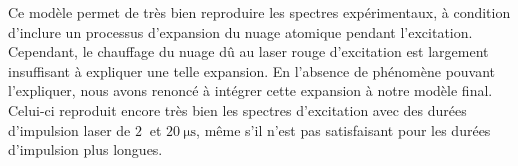 %

Ce modèle permet de très bien reproduire les spectres expérimentaux, à condition d'inclure un processus d'expansion du nuage atomique pendant l'excitation.
Cependant, le chauffage du nuage dû au laser rouge d'excitation est largement insuffisant à expliquer une telle expansion.
En l'absence de phénomène pouvant l'expliquer, nous avons renoncé à intégrer cette expansion à notre modèle final.
Celui-ci reproduit encore très bien les spectres d'excitation avec des durées d'impulsion laser de $\SI{2}{}$ et $\SI{20}{\us}$, même s'il n'est pas satisfaisant pour les durées d'impulsion plus longues.

